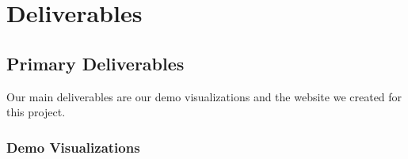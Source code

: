 \documentclass[paper=a4, fontsize=11pt]{report} %
\begin{document}


\chapter{Deliverables} %
\label{cha:deliverables}

\section{Primary Deliverables} %
\label{sec:primary_deliverables}

Our main deliverables are our demo visualizations and the website we created for this project.

\subsection{Demo Visualizations} %
\label{sub:demo_visualizations}
\end{document}
